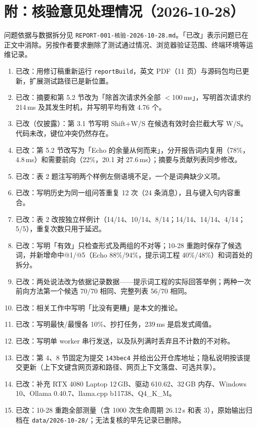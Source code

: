 \documentclass[11pt,a4paper,fontset=windows]{ctexart}
\newcommand{\code}[1]{\texttt{#1}}
\begin{document}
\section*{附：核验意见处理情况（2026-10-28）}
\small
问题依据与数据拆分见 \code{REPORT-001-核验-2026-10-28.md}。「已改」表示问题已在正文中消除。另按作者要求删除了测试通过情况、浏览器验证范围、终端环境等运维记录。
\begin{enumerate}\setlength{\itemsep}{1pt}
\item[A1] 已改：用修订稿重新运行 \code{reportBuild}，英文 PDF（11 页）与源码包均已更新，扩展测试路径已是新位置。
\item[A2] 已改：摘要和第 5.2 节改为「除首次请求外全部 $<$100\,ms」，写明首次请求约 214\,ms 及其发生时机，并写明平均有效 4.76 个。
\item[A3] 已改（仅披露）：第 3.1 节写明 Shift+W/S 在候选有效时会拦截大写 W/S。代码未改，键位冲突仍然存在。
\item[A4] 已改：第 5.2 节改写为「Echo 的余量从何而来」，分开报告词内复用（78\%，4.8\,ms）和需要前向（22\%，20.1 对 27.6\,ms）；摘要与贡献列表同步修改。
\item[A5] 已改：表 2 题注写明两个样例左侧语境不足，一个是词典缺少义项。
\item[A6] 已改：写明历史为同一组问答重复 12 次（24 条消息），且与键入句内容重合。
\item[A7] 已改：表 2 改按独立样例计（14/14、10/14、8/14；14/14、14/14、4/14；5/5），重复次数只用于延迟。
\item[B8] 已改：写明「有效」只检查形式及两组的不对等；10-28 重跑时保存了候选词，并新增命中@1/@5（Echo 88\%/94\%，提示词工程 40\%/48\%）和词首处的拆分。
\item[B9] 已改：两处说法改为依据记录数据——提示词工程的实际回答举例；两种一次前向方法第一个候选 70/70 相同、完整列表 56/70 相同。
\item[B10] 已改：相关工作中写明「比没有更糟」是本文的推论。
\item[B11] 已改：写明最快/最慢各 10\%、抄打任务，239\,ms 是启发式阈值。
\item[B12] 已改：写明单 worker 串行发送，以及队列满时丢弃且不计数的不对称。
\item[B13] 已改：第 4、8 节固定为提交 \code{143bec4} 并给出公开仓库地址；隐私说明按该提交更新（上下文键含网页源和路径、网页上下文落盘、可选共享）。
\item[B14] 已改：补充 RTX 4080 Laptop 12\,GB、驱动 610.62、32\,GB 内存、Windows 10、Ollama 0.40.7、llama.cpp b11738、Q4\_K\_M。
\item[B15] 已改：10-28 重跑全部测量（含 1000 次生命周期 26.12\,s 和表 3），原始输出归档在 \code{data/2026-10-28/}；无法复核的早先记录已删除。

\end{enumerate}
\end{document}
